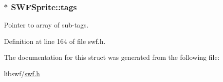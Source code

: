 \hypertarget{struct_s_w_f_sprite_ade3a1182fa49e25d252ade80aac6f873}{
\subsubsection[{tags}]{$\ast$ S\-W\-F\-Sprite\-::tags}}\label{struct_s_w_f_sprite_ade3a1182fa49e25d252ade80aac6f873}


Pointer to array of sub-\/tags. 



Definition at line 164 of file swf.\-h.



The documentation for this struct was generated from the following file\-:\begin{DoxyCompactItemize}
\item 
libswf/\hyperlink{swf_8h}{swf.\-h}\end{DoxyCompactItemize}
